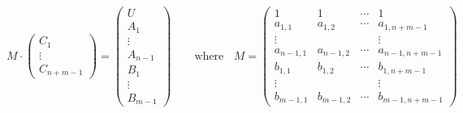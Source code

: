 \begin{equation}
	M \cdot 
		\begin{pmatrix}
			C_1 	\\
			\vdots 	\\
			C_{n+m-1}
		\end{pmatrix}
	=
		\begin{pmatrix}
			U 		\\[-0.5em] 
			A_1 	\\[-0.5em] 
			\vdots 	\\[-0.5em] 
			A_{n-1}	\\[-0.5em] 
			B_1 	\\[-0.5em] 
			\vdots 	\\[-0.5em] 
			B_{m-1}
		\end{pmatrix}
	\;\;\;\;\;\;\text{ where }\;\;
	M = \begin{pmatrix}
			1			& 1			& \cdots 	& 1 					\\[-0.5em]
			a_{1,1}		& a_{1,2}	& \cdots 	& a_{1, n+m-1} 		\\[-0.5em]
			\vdots 		&			&			& \vdots 			\\[-0.5em]
			a_{n-1,1}	& a_{n-1, 2}	& \cdots 	& a_{n-1, n+m-1} 	\\[-0.5em]
			b_{1,1} 		& b_{1,2} 	& \cdots 	& b_{1, n+m-1}		\\[-0.5em]
			\vdots 		& 			&			& \vdots 			\\[-0.5em]
			b_{m-1,1} 	& b_{m-1,2}	& \cdots 	& b_{m-1,n+m-1}
	\end{pmatrix}
\end{equation}


